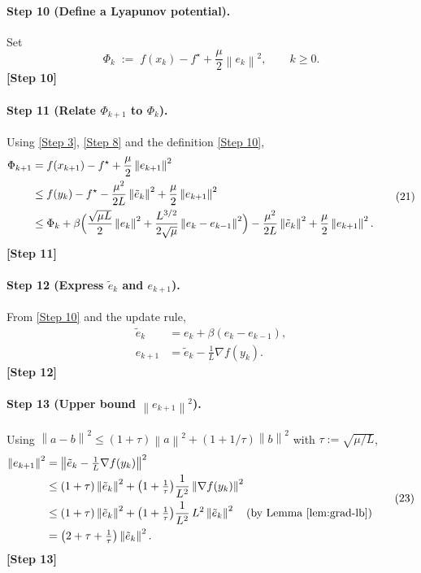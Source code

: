 \documentclass{article}
\newcommand{\norm}[1]{\left\lVert#1\right\rVert}
\begin{document}
\paragraph{Step 10 (Define a Lyapunov potential).}
Set
\[
\Phi_{k}\;:=\;f(x_{k})-f^{\star}+\frac{\mu}{2}\norm{e_{k}}^{2},
\qquad k\ge 0.
\tag{20}
\]
\textbf{[Step 10]}

\paragraph{Step 11 (Relate $\Phi_{k+1}$ to $\Phi_{k}$).}
Using \eqref{Step 3}, \eqref{Step 8} and the definition \eqref{Step 10},
\[
\begin{aligned}
\Phi_{k+1}
&=f(x_{k+1})-f^{\star}+\frac{\mu}{2}\norm{e_{k+1}}^{2}\\
&\le f(y_{k})-f^{\star}
-\frac{\mu^{2}}{2L}\norm{\tilde e_{k}}^{2}
+\frac{\mu}{2}\norm{e_{k+1}}^{2}\\
&\le \Phi_{k}
+\beta\Bigl(\frac{\sqrt{\mu L}}{2}\norm{e_{k}}^{2}
+\frac{L^{3/2}}{2\sqrt{\mu}}\norm{e_{k}-e_{k-1}}^{2}\Bigr)
-\frac{\mu^{2}}{2L}\norm{\tilde e_{k}}^{2}
+\frac{\mu}{2}\norm{e_{k+1}}^{2}.
\end{aligned}
\tag{21}
\]
\textbf{[Step 11]}

\paragraph{Step 12 (Express $\tilde e_{k}$ and $e_{k+1}$).}
From \eqref{Step 10} and the update rule,
\[
\begin{aligned}
\tilde e_{k}&=e_{k}+\beta(e_{k}-e_{k-1}),\\
e_{k+1}&=\tilde e_{k}-\frac{1}{L}\nabla f(y_{k}).
\end{aligned}
\tag{22}
\]
\textbf{[Step 12]}

\paragraph{Step 13 (Upper bound $\norm{e_{k+1}}^{2}$).}
Using $\norm{a-b}^{2}\le (1+\tau)\norm{a}^{2}+(1+1/\tau)\norm{b}^{2}$
with $\tau:=\sqrt{\mu/L}$,
\[
\begin{aligned}
\norm{e_{k+1}}^{2}
&=\norm{\tilde e_{k}-\tfrac{1}{L}\nabla f(y_{k})}^{2}\\
&\le (1+\tau)\norm{\tilde e_{k}}^{2}
+\bigl(1+\tfrac{1}{\tau}\bigr)\frac{1}{L^{2}}\norm{\nabla f(y_{k})}^{2}\\
&\le (1+\tau)\norm{\tilde e_{k}}^{2}
+\bigl(1+\tfrac{1}{\tau}\bigr)\frac{1}{L^{2}}\,L^{2}\norm{\tilde e_{k}}^{2}
\quad\text{(by Lemma~\ref{lem:grad-lb})}\\
&= \bigl(2+\tau+\tfrac{1}{\tau}\bigr)\norm{\tilde e_{k}}^{2}.
\end{aligned}
\tag{23}
\]
\textbf{[Step 13]}
\end{document}
